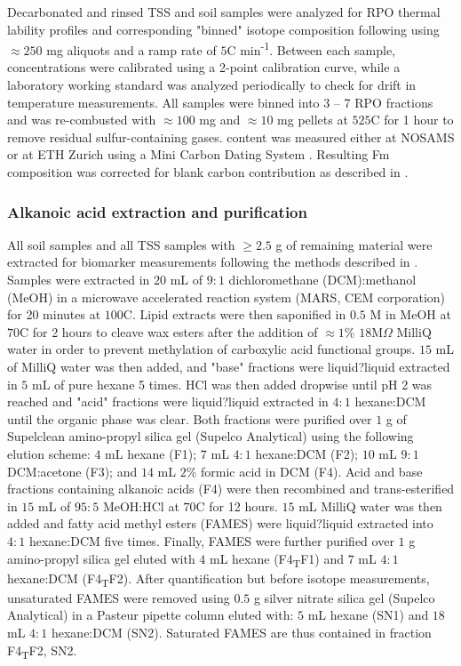 Decarbonated and rinsed TSS and soil samples were analyzed for RPO thermal lability profiles and corresponding "binned" isotope composition following \citet{Hemingway:2016rc} using $\approx 250$ mg aliquots and a ramp rate of $5$\textdegree C min\textsuperscript{-1}. Between each sample,  concentrations were calibrated using a 2-point calibration curve, while a laboratory working standard was analyzed periodically to check for drift in temperature measurements. All samples were binned into 3 -- 7 RPO fractions and  was re-combusted with $\approx 100$ mg  and $\approx 10$ mg  pellets at $525$\textdegree C for 1 hour to remove residual sulfur-containing gases.   content was measured either at NOSAMS or at ETH Zurich using a Mini Carbon Dating System \citep[Micadas;][]{McNichol:1994ty,Christl:2013ks}. Resulting Fm composition was corrected for blank carbon contribution as described in \citet{Hemingway:2016rc}.

\subsubsection{Alkanoic acid extraction and purification}

All soil samples and all TSS samples with $\geq 2.5$ g of remaining material were extracted for biomarker measurements following the methods described in \citet{Hemingway:2016bq}. Samples were extracted in $20$ mL of $9:1$ dichloromethane (DCM):methanol (MeOH) in a microwave accelerated reaction system (MARS, CEM corporation) for 20 minutes at $100$\textdegree C. Lipid extracts were then saponified in $0.5$ M  in MeOH at $70$\textdegree C for 2 hours to cleave wax esters after the addition of $\approx 1$\% $18$M$\Omega$ MilliQ water in order to prevent methylation of carboxylic acid functional groups. $15$ mL of MilliQ water was then added, and "base" fractions were liquid?liquid extracted in $5$ mL of pure hexane 5 times. HCl was then added dropwise until pH 2 was reached and "acid" fractions were liquid?liquid extracted in $4:1$ hexane:DCM until the organic phase was clear. Both fractions were purified over $1$ g of Supelclean amino-propyl silica gel (Supelco Analytical) using the following elution scheme: $4$ mL hexane (F1); $7$ mL $4:1$ hexane:DCM (F2); $10$ mL $9:1$ DCM:acetone (F3); and $14$ mL $2$\% formic acid in DCM (F4). Acid and base fractions containing alkanoic acids (F4) were then recombined and trans-esterified in $15$ mL of $95:5$ MeOH:HCl at $70$\textdegree C for 12 hours. $15$ mL MilliQ water was then added and fatty acid methyl esters (FAMES) were liquid?liquid extracted into $4:1$ hexane:DCM five times. Finally, FAMES were further purified over $1$ g amino-propyl silica gel eluted with $4$ mL hexane (F4\textsubscript{T}F1) and $7$ mL $4:1$ hexane:DCM (F4\textsubscript{T}F2). After quantification but before isotope measurements, unsaturated FAMES were removed using $0.5$ g silver nitrate silica gel (Supelco Analytical) in a Pasteur pipette column eluted with: $5$ mL hexane (SN1) and $18$ mL $4:1$ hexane:DCM (SN2). Saturated FAMES are thus contained in fraction F4\textsubscript{T}F2, SN2.

